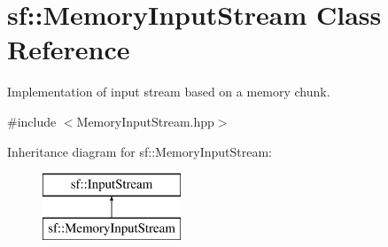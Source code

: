 \hypertarget{classsf_1_1_memory_input_stream}{}\section{sf\+:\+:Memory\+Input\+Stream Class Reference}
\label{classsf_1_1_memory_input_stream}


Implementation of input stream based on a memory chunk.  




{\ttfamily \#include $<$Memory\+Input\+Stream.\+hpp$>$}

Inheritance diagram for sf\+:\+:Memory\+Input\+Stream\+:\begin{figure}[H]
\begin{center}
\leavevmode
\includegraphics[height=2.000000cm]{classsf_1_1_memory_input_stream}
\end{center}
\end{figure}
